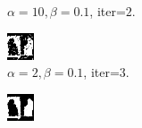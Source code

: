 \documentclass{article}
\begin{document}
\begin{figure}[t]
\begin{subfigure}[t]{0.27\textwidth}
  \vspace{-0.6cm}
  \caption{$\alpha=10, \beta=0.1$, iter=$2$.}
\end{subfigure}
\begin{subfigure}[t]{0.27\textwidth}
  \centering
  \includegraphics[width=\textwidth]{ii_alpha_2_beta_0.1_iterations_4.bmp}
  \vspace{-0.6cm}
  \caption{$\alpha=2, \beta=0.1$, iter=$3$.}
\end{subfigure}
\begin{subfigure}[t]{0.27\textwidth}
  \centering
  \includegraphics[width=\textwidth]{ii_alpha_5_beta_0.1_iterations_4.bmp}

\end{subfigure}
\end{figure}
\end{document}

